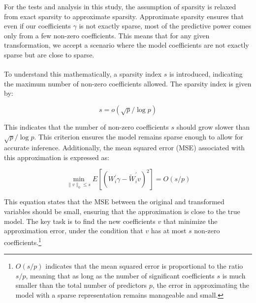 For the tests and analysis in this study, the assumption of sparsity is relaxed from exact sparsity to approximate sparsity. Approximate sparsity ensures that even if our coefficients $\gamma$ is not exactly sparse, most of the predictive power comes only from a few non-zero coefficients. This means that for any given transformation, we accept a scenario where the model coefficients are not exactly sparse but are close to sparse.\\
\\
To understand this mathematically, a sparsity index $s$ is introduced, indicating the maximum number of non-zero coefficients allowed. The sparsity index is given by:

\begin{equation}
s = o\left(\sqrt{p} / \log p\right)
\end{equation}

This indicates that the number of non-zero coefficients $s$ should grow slower than $\sqrt{p}/\log p$. This criterion ensures the model remains sparse enough to allow for accurate inference. Additionally, the mean squared error (MSE) associated with this approximation is expressed as:

\begin{equation}
\min _{\|v\|_0 \leq s} E\left[\left(W_i^{\prime} \gamma - \tilde{W}_i^{\prime} v\right)^2\right] = O(s / p)
\end{equation}

This equation states that the MSE between the original and transformed variables should be small, ensuring that the approximation is close to the true model. The key task is to find the new coefficients $v$ that minimize the approximation error, under the condition that $v$ has at most $s$ non-zero coefficients.\footnote{\footnotesize $O(s/p)$ indicates that the mean squared error is proportional to the ratio $s/p$, meaning that as long as the number of significant coefficients $s$ is much smaller than the total number of predictors $p$, the error in approximating the model with a sparse representation remains manageable and small.}

